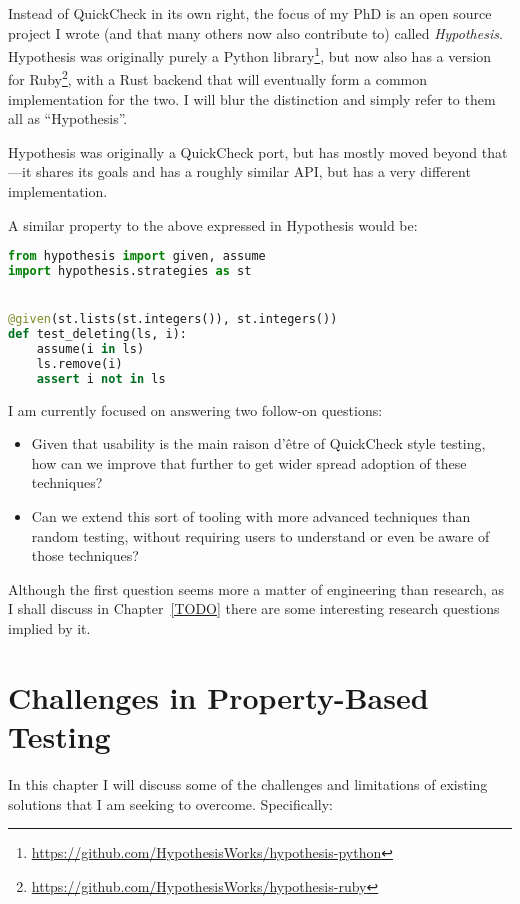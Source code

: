 Instead of QuickCheck in its own right,
the focus of my PhD is an open source project I wrote (and that many others now also contribute to) called \emph{Hypothesis}.
Hypothesis was originally purely a Python library\footnote{\url{https://github.com/HypothesisWorks/hypothesis-python}},
but now also has a version for Ruby\footnote{\url{https://github.com/HypothesisWorks/hypothesis-ruby}},
with a Rust backend that will eventually form a common implementation for the two.
I will blur the distinction and simply refer to them all as ``Hypothesis''.

Hypothesis was originally a QuickCheck port,
but has mostly moved beyond that---it
shares its goals and has a roughly similar API,
but has a very different implementation.

A similar property to the above expressed in Hypothesis would be:

\begin{lstlisting}[language=Python]
from hypothesis import given, assume
import hypothesis.strategies as st


@given(st.lists(st.integers()), st.integers())
def test_deleting(ls, i):
    assume(i in ls)
    ls.remove(i)
    assert i not in ls
\end{lstlisting}

I am currently focused on answering two follow-on questions:

\begin{itemize}
\item Given that usability is the main raison d'être of QuickCheck style testing,
how can we improve that further to get wider spread adoption of these techniques?
\item Can we extend this sort of tooling with more advanced techniques than random testing,
without requiring users to understand or even be aware of those techniques?
\end{itemize}

Although the first question seems more a matter of engineering than research,
as I shall discuss in Chapter~\ref{TODO} there are some interesting research questions implied by it.

\chapter{Challenges in Property-Based Testing}

In this chapter I will discuss some of the challenges and limitations of existing solutions that I am seeking to overcome.
Specifically:

